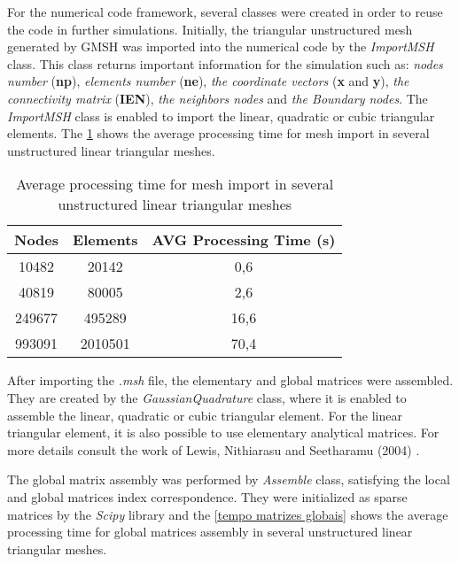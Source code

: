 For the numerical code framework, several classes were created in 
order to reuse the code in further simulations. 
Initially, the triangular unstructured mesh generated by GMSH \cite{gmsh}
was imported into the numerical code by the \textit{ImportMSH} class.
This class returns important information for the simulation 
such as:
\textit{nodes number} (\textbf{np}), 
\textit{elements number} (\textbf{ne}), 
\textit{the coordinate vectors} (\textbf{x} and \textbf{y}), 
\textit{the connectivity matrix} (\textbf{IEN}),
\textit{the neighbors nodes} and 
\textit{the Boundary nodes}. 
The \textit{ImportMSH} class is 
enabled to import the linear, quadratic or cubic triangular elements.
The \ref{tempo malha} shows the average processing time for 
mesh import in several unstructured linear triangular meshes.

\vspace{0.5cm}
\begin{table}[H]
\centering
\begin{tabular}{ccc}
\toprule
\textbf{Nodes} & \textbf{Elements} & \textbf{AVG Processing Time} (s) \\
\midrule
10482 & 20142 & 0,6 \\
40819 & 80005 & 2,6 \\
249677 & 495289 & 16,6 \\
993091 & 2010501 & 70,4 \\
\bottomrule
\end{tabular}
\caption{Average processing time for mesh import in several unstructured linear triangular meshes}
\label{tempo malha}
\end{table}

\medskip
After importing the \textit{.msh} file, the elementary and global matrices 
were assembled. 
They are created by the \textit{GaussianQuadrature} class, where it is enabled to assemble the linear, quadratic or cubic triangular element.
For the linear 
triangular element, it is also possible to use elementary 
analytical matrices. For more details consult the work of Lewis, 
Nithiarasu and Seetharamu (2004) \cite{lewis2004}.

\medskip
The global matrix assembly was performed by \textit{Assemble} class, satisfying the local and global matrices index correspondence.
They were initialized as sparse matrices by 
the \textit{Scipy} library \cite{scipy} and 
the \ref{tempo matrizes globais} shows the average processing time 
for global matrices assembly in several unstructured linear 
triangular meshes.

